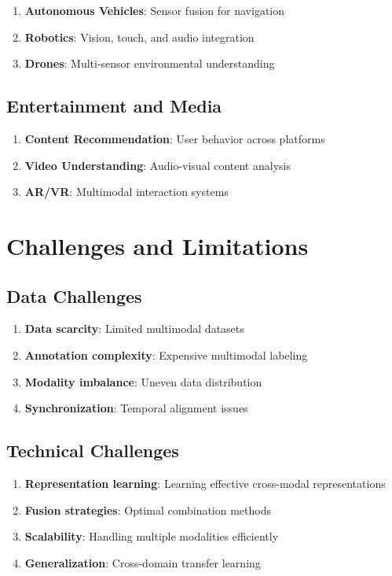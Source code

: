 \documentclass[11pt,a4paper]{article}
\begin{document}
\begin{enumerate}
\item \textbf{Autonomous Vehicles}: Sensor fusion for navigation
\item \textbf{Robotics}: Vision, touch, and audio integration
\item \textbf{Drones}: Multi-sensor environmental understanding
\end{enumerate}

\subsection{Entertainment and Media}

\begin{enumerate}
\item \textbf{Content Recommendation}: User behavior across platforms
\item \textbf{Video Understanding}: Audio-visual content analysis
\item \textbf{AR/VR}: Multimodal interaction systems
\end{enumerate}

\section{Challenges and Limitations}

\subsection{Data Challenges}

\begin{enumerate}
\item \textbf{Data scarcity}: Limited multimodal datasets
\item \textbf{Annotation complexity}: Expensive multimodal labeling
\item \textbf{Modality imbalance}: Uneven data distribution
\item \textbf{Synchronization}: Temporal alignment issues
\end{enumerate}

\subsection{Technical Challenges}

\begin{enumerate}
\item \textbf{Representation learning}: Learning effective cross-modal representations
\item \textbf{Fusion strategies}: Optimal combination methods
\item \textbf{Scalability}: Handling multiple modalities efficiently
\item \textbf{Generalization}: Cross-domain transfer learning
\end{enumerate}
\end{document}
